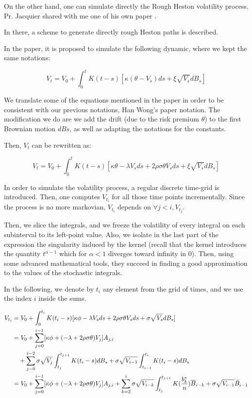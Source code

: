 On the other hand, one can simulate directly the Rough Heston volatility process. Pr. Jacquier shared with me one of his own paper \cite{ROUGH_HESTON}.

In there, a scheme to generate directly rough Heston paths is described. 

In the paper, it is proposed to simulate the following dynamic, where we kept the same notations: 

$$
V_t = V_0 + \int_0^t K(t-s) [ \kappa ( \theta - V_s ) ds + \xi \sqrt{ V_s } d B_s ]
$$

We translate some of the equations mentioned in the paper in order to be consistent with our previous notations, Han Wong's paper notation.
The modification we do are we add the drift (due to the risk premium $\theta$) to the first Brownian motion $dBs$, as well as adapting the notations for the constants. 

Then, $V_t$ can be rewritten as:

$$
V_t = V_0 + \int_0^t K(t-s) [ \kappa \theta - \lambda V_s  ds + 2 \rho \sigma \theta V_s ds + \xi \sqrt{ V_s } d B_s ]
$$


In order to simulate the volatility process, a regular discrete time-grid is introduced. Then, one computes $V_{t_i}$ for all those time points incrementally. Since the process is no more markovian, $V_{t_i}$ depends on $ \forall j < i, V_{t_j}$. 

Then, we slice the integrals, and we freeze the volatility of every integral on each subinterval to its left-point value. 
Also, we isolate in the last part of the expression the singularity induced by the kernel (recall that the kernel introduces the quantity $t^{\alpha - 1} $ which for $\alpha < 1$ diverges toward infinity in 0). 
Then, using some advanced mathematical tools, they succeed in finding a good approximation to the values of the stochastic integrals. 

In the following, we denote by $t_i$ any element from the grid of times, and we use the index $i$ inside the sums.


\begin{align}
V_{t_i} &= V_0 + \int_0^{t_{i}} K(t_i-s) [ \kappa \phi - \lambda V_s  ds + 2 \rho \sigma \theta V_s ds + \sigma \sqrt{ V_s } d B_s ]    \notag   \\
&= V_0 + \sum_{j=0}^{i-1} [ \kappa \phi + (-\lambda + 2 \rho \sigma \theta ) V_j ] A_{j,i}  \notag \\
& \quad + \sum_{j=0}^{i-2} \sigma \sqrt{ V_j } \int_{t_j}^{t_{j+1} } K( t_i - s ) dB_s + \sigma \sqrt{ V_{i-1} } \int^{t_i}_{t_{i-1}} K( t_i - s ) dB_s  \notag \\
&= V_0 + \sum_{j=0}^{i-1} [ \kappa \phi + (-\lambda + 2 \rho \sigma \theta ) V_j ] A_{j,i} 
+ \sum_{k=2}^{i} \sigma \sqrt{ V_{i-k} } \int_{t_j}^{t_{j+1} } K( \frac{b_k^*}{n} ) \overline{B}_{i-k} + \sigma \sqrt{ V_{i-1} } \tilde{B }_{i-1}  \label{eq:rough_heston_final_form}
\end{align}

